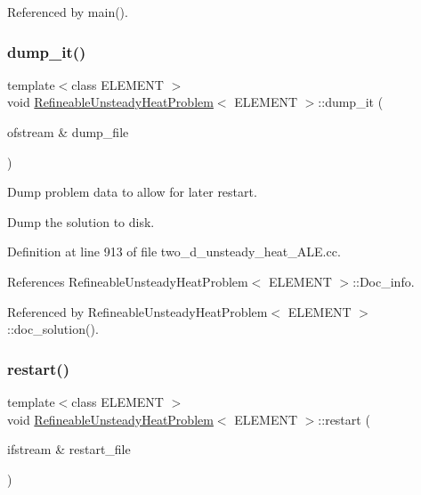 Referenced by main().

\mbox{\label{classRefineableUnsteadyHeatProblem_a1fb939c3f9c258fd49328bb1516ced98}} 
\subsubsection{\texorpdfstring{dump\+\_\+it()}{dump\_it()}}
{\footnotesize\ttfamily template$<$class E\+L\+E\+M\+E\+NT $>$ \\
void \hyperlink{classRefineableUnsteadyHeatProblem}{Refineable\+Unsteady\+Heat\+Problem}$<$ E\+L\+E\+M\+E\+NT $>$\+::dump\+\_\+it (\begin{DoxyParamCaption}\item[{ofstream \&}]{dump\+\_\+file }\end{DoxyParamCaption})}



Dump problem data to allow for later restart. 

Dump the solution to disk. 

Definition at line 913 of file two\+\_\+d\+\_\+unsteady\+\_\+heat\+\_\+\+A\+L\+E.\+cc.



References Refineable\+Unsteady\+Heat\+Problem$<$ E\+L\+E\+M\+E\+N\+T $>$\+::\+Doc\+\_\+info.



Referenced by Refineable\+Unsteady\+Heat\+Problem$<$ E\+L\+E\+M\+E\+N\+T $>$\+::doc\+\_\+solution().

\mbox{\label{classRefineableUnsteadyHeatProblem_af36fa71e72852367411e21b50b179625}} 
\subsubsection{\texorpdfstring{restart()}{restart()}}
{\footnotesize\ttfamily template$<$class E\+L\+E\+M\+E\+NT $>$ \\
void \hyperlink{classRefineableUnsteadyHeatProblem}{Refineable\+Unsteady\+Heat\+Problem}$<$ E\+L\+E\+M\+E\+NT $>$\+::restart (\begin{DoxyParamCaption}\item[{ifstream \&}]{restart\+\_\+file }\end{DoxyParamCaption})}



